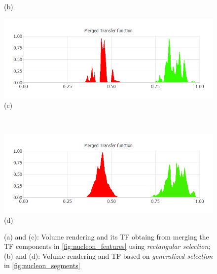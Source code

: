 \documentclass[twoside,twocolumn,10pt]{article}
\begin{document}
\begin{figure}
\begin{minipage}{.16\textwidth}
		(b)
	\end{minipage}
	\begin{minipage}{.16\textwidth}
		\centering
		\includegraphics[width=1\linewidth]{nucleon_green_red_Merged_Transfer_function}
		(c)
	\end{minipage}~
	\begin{minipage}{.16\textwidth}
		\centering
		\includegraphics[width=1\linewidth]{nucleon_green_red_segment_Merged_Transfer_function}
		(d)
	\end{minipage}
	\caption{(a) and (c): Volume rendering and its TF obtaing from merging the TF components in \autoref{fig:nucleon_features} using \emph{rectangular selection}; (b) and (d): Volume rendering and TF based on \emph{generalized selection} in \autoref{fig:nucleon_segments}}
	\label{fig:nucleon_merged}
\end{figure}

\end{document}
